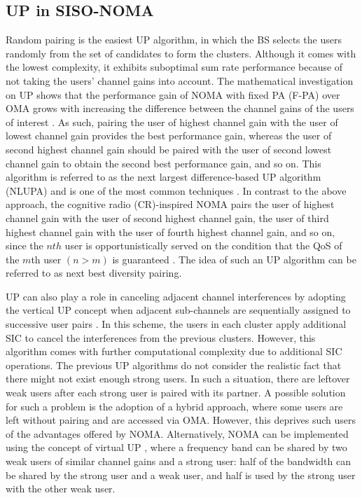 \documentclass[10pt,final,journal,a4paper,twoside,twocolumn,romanappendices]{IEEEtran}
\theoremstyle{myremark}
\theoremstyle{myremark}
\begin{document}
\subsection{UP in SISO-NOMA}
Random pairing is the easiest UP algorithm, in which the BS selects the users randomly from the set of candidates to form the clusters. Although it comes with the lowest complexity, it exhibits suboptimal sum rate performance because of not taking the users' channel gains into account. The mathematical investigation on UP shows that the performance gain of NOMA with fixed PA (F-PA) over OMA grows with increasing the difference between the channel gains of the users of interest \cite{19}. As such, pairing the user of highest channel gain with the user of lowest channel gain provides the best performance gain, whereas the user of second highest channel gain should be paired with the user of second lowest channel gain to obtain the second best performance gain, and so on. This algorithm is referred to as the next largest difference-based UP algorithm (NLUPA) and is one of the most common techniques \cite{19}. In contrast to the above approach, the cognitive radio (CR)-inspired NOMA pairs the user of highest channel gain with the user of second highest channel gain, the user of third highest channel gain with the user of fourth highest channel gain, and so on, since the $nth$ user is opportunistically served on the condition that the QoS of the $m$th user $(n>m)$ is guaranteed \cite{19}. The idea of such an UP algorithm can be referred to as next best diversity pairing.


UP can also play a role in canceling adjacent channel interferences by adopting the vertical UP concept when adjacent sub-channels are sequentially assigned to successive user pairs \cite{21}. In this scheme, the users in each cluster apply additional SIC to cancel the interferences from the previous clusters. However, this algorithm comes with further computational complexity due to additional SIC operations. {\color{black}The previous UP algorithms do not consider the realistic fact that there might not exist enough strong users. In such a situation, there are leftover weak users after each strong user is paired with its partner. A possible solution for such a problem is the adoption of a hybrid approach, where some users are left without pairing and are accessed via OMA. However, this deprives such users of the advantages offered by NOMA. Alternatively, NOMA can be implemented using the concept of virtual UP \cite{22}, where a frequency band can be shared by two weak users of similar channel gains and a strong user: half of the bandwidth can be shared by the strong user and a weak user, and half is used by the strong user with the other weak user}.
\end{document}
